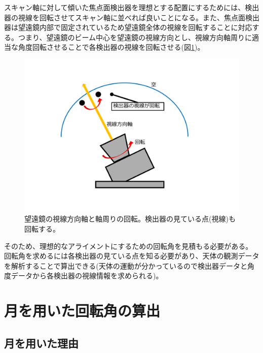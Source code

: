 スキャン軸に対して傾いた焦点面検出器を理想とする配置にするためには、検出器の視線を回転させてスキャン軸に並べれば良いことになる。また、焦点面検出器は望遠鏡内部で固定されているため望遠鏡全体の視線を回転することに対応する。つまり、望遠鏡のビーム中心を望遠鏡の視線方向とし、視線方向軸周りに適当な角度回転させることで各検出器の視線を回転させる(図\ref{boresight_axis})。
\begin{figure}[htbp]
  \centering
  \includegraphics[width=0.8\columnwidth]{5_alignment/figs/boresight_rot_mod.pdf}
  \caption{望遠鏡の視線方向軸と軸周りの回転。検出器の見ている点(視線)も回転する。}
  \label{boresight_axis}
\end{figure}

そのため、理想的なアライメントにするための回転角を見積もる必要がある。回転角を求めるには各検出器の見ている点を知る必要があり、天体の観測データを解析することで算出できる(天体の運動が分かっているので検出器データと角度データから各検出器の視線情報を求められる)。

\section{月を用いた回転角の算出}

\subsection{月を用いた理由}

